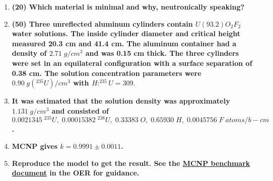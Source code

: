 \documentclass[11pt,a4paper]{article}
\begin{document}
\begin{enumerate}[leftmargin=*,topsep=0pt,font=\bfseries]
        \newpage 
    \item\textbf{(20) Which material is minimal and why, neutronically speaking?}
        \vspace{0.25in}\\

































        \newpage 
    \item\textbf{(50) Three unreflected aluminum cylinders contain $U(93.2)O_2F_2$ water solutions. The inside cylinder diameter and critical height measured 20.3 cm and 41.4 cm. The aluminum container had a density of $2.71 \; g/cm^3$ and was 0.15 cm thick. The three cylinders were set in an equilateral configuration with a surface separation of 0.38 cm. The solution concentration parameters were $0.90 \; g(^{235}U)/cm^3$ with $H:^{235}U = 309$}.
    \item[]\textbf{It was estimated that the solution density was approximately $1.131 \; g/cm^3$ and consisted of $0.0021345\;^{235}U, \; 0.00015382\;^{238}U, \; 0.33383\;O, \; 0.65930\;H, \; 0.0045756\;F \; atoms/b-cm$.}
    \item[]\textbf{MCNP gives $k = 0.9991\pm0.0011$.}
    \item[]\textbf{Reproduce the model to get the result. See the \href{https://courses.lumenlearning.com/uidaho-nuclear/chapter/mcnp/}{MCNP benchmark document} in the OER for guidance.}
        \vspace{0.25in}\\

























\end{enumerate}
\end{document}
